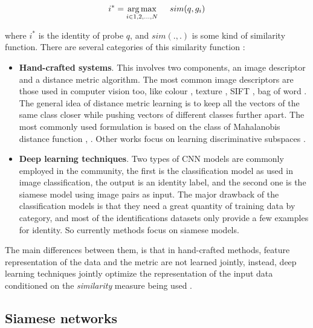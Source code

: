 
$$ i^{*} = \underset{i \in 1,2,...,N}{\arg\max} \hspace{0.5cm} sim(q,g_{i}) $$

where $i^{*}$ is the identity of probe $q$, and $sim( . , . )$ is some kind of similarity function. There are several categories of this similarity function \cite{pastPresent}:

\begin{itemize}
 
\item \textbf{Hand-crafted systems}. This involves two components, an image descriptor and a distance metric algorithm. The most common image descriptors are those used in computer vision too, like colour \cite{lbp}, texture \cite{pairwise}, SIFT \cite{sift}, bag of word \cite{bagword}. The general idea of distance metric learning is to keep all the vectors of the same class closer while pushing vectors of different classes further apart. The most commonly used formulation is based on the class of Mahalanobis distance function \cite{kiisme}, \cite{lnnn}. Other works focus on learning discriminative subspaces \cite{lda}.

\item \textbf{Deep learning techniques}. Two types of CNN models are commonly employed in the community, the first is the classification model as used in image classification, the output is an identity label, and the second one is the siamese model using image pairs as input. The major drawback of the classification models is that they need a great quantity of training data by category, and most of the identifications datasets only provide a few examples for identity. So currently methods focus on siamese models.

\end{itemize} 

The main differences between them, is that in hand-crafted methods, feature representation of the data and the metric are not learned jointly, instead, deep learning techniques jointly optimize the representation of the input data conditioned on the \textit{similarity} measure being used \cite{EC1}. 





\subsection{Siamese networks}



